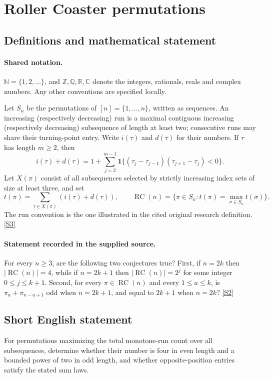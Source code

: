 \documentclass[11pt]{book}
\newcommand{\sref}[2]{\hyperlink{source:#1:#2}{[S#2]}}
\begin{document}
\section{Roller Coaster permutations}\label{statement}

\subsection{Definitions and mathematical statement}

\paragraph{Shared notation.}$\mathbb N=\{1,2,\ldots\}$, and $\mathbb Z,\mathbb Q,\mathbb R,\mathbb C$ denote the integers, rationals, reals and complex numbers. Any other conventions are specified locally.


Let $S_n$ be the permutations of $[n]=\{1,\ldots,n\}$, written as sequences. An increasing (respectively decreasing) run is a maximal contiguous increasing (respectively decreasing) subsequence of length at least two; consecutive runs may share their turning-point entry. Write $i(\tau)$ and $d(\tau)$ for their numbers. If $\tau$ has length $m\geq2$, then
\[i(\tau)+d(\tau)=1+\sum_{j=2}^{m-1}\mathbf1\bigl\{(\tau_j-\tau_{j-1})(\tau_{j+1}-\tau_j)<0\bigr\}.\]
Let $X(\pi)$ consist of all subsequences selected by strictly increasing index sets of size at least three, and set
\[t(\pi)=\sum_{\tau\in X(\pi)}(i(\tau)+d(\tau)),\qquad\operatorname{RC}(n)=\{\pi\in S_n:t(\pi)=\max_{\sigma\in S_n}t(\sigma)\}.\]
The run convention is the one illustrated in the cited original research definition. \sref{statement}{3}
\paragraph{Statement recorded in the supplied source.}
For every $n\geq3$, are the following two conjectures true? First, if $n=2k$ then $|\operatorname{RC}(n)|=4$, while if $n=2k+1$ then $|\operatorname{RC}(n)|=2^j$ for some integer $0\leq j\leq k+1$. Second, for every $\pi\in\operatorname{RC}(n)$ and every $1\leq a\leq k$, is $\pi_a+\pi_{n-a+1}$ odd when $n=2k+1$, and equal to $2k+1$ when $n=2k$? \sref{statement}{2}
\subsection{Short English statement}
For permutations maximizing the total monotone-run count over all subsequences, determine whether their number is four in even length and a bounded power of two in odd length, and whether opposite-position entries satisfy the stated sum laws.
\end{document}
